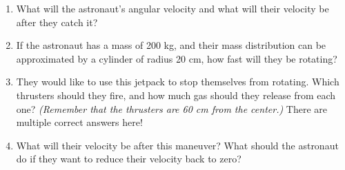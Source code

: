 \documentclass[12pt]{article}
\begin{document}
\begin{enumerate}
\begin{enumerate}
					
					\item What will the astronaut's angular velocity and what will their velocity be after they catch it?

					\item If the astronaut has a mass of 200 kg, and their mass distribution can be approximated by a cylinder of radius 20 cm, how fast will they be rotating?
					

					
					\item They would like to use this jetpack to stop themselves from rotating. Which thrusters should they fire, and how much gas should they release from each one? {\it (Remember that the thrusters are 60 cm from the center.)} There are multiple correct answers here!
					

					
					\item What will their velocity be after this maneuver? What should the astronaut do if they want to reduce their velocity back to zero?
				\end{enumerate}




\end{enumerate}
\end{document}
